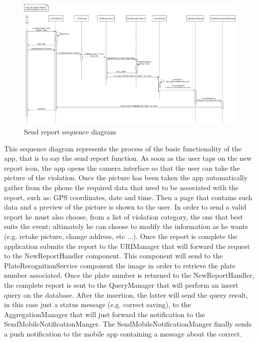 \begin{figure}[H]
  \centering
  \includegraphics[width=1\textwidth]{Images/UML_diagrams/Sequence_Diagrams/Send_Report_sd.png}
  \caption{Send report sequence diagram}
  \label{fig:send_report_sd}
\end{figure}
This sequence diagram represents the process of the basic functionality of the app, that is to say the send report function. As soon as the user taps on the new report icon, the app opens the camera interface so that the user can take the picture of the violation. Once the picture has been taken the app automatically gather from the phone the required data that need to be associated with the report, such as: GPS coordinates, date and time. Then a page that contains such data and a preview of the picture is shown to the user. In order to send a valid report he must also choose, from a list of violation category, the one that best suits the event; ultimately he can choose to modify the information as he wants (e.g. retake picture, change address, etc ...). Once the report is complete the application submits the report to the URIManager that will forward the request to the NewReportHandler component. This component will send to the PlateRecognitionService component the image in order to retrieve the plate number associated. Once the plate number is returned to the NewReportHandler, the complete report is sent to the QueryManager that will perform an insert query on the database. After the insertion, the latter will send the query result, in this case just a status message (e.g. correct saving), to the AggregationManager that will just forward the notification to the SendMobileNotificationManger. The SendMobileNotificationManger finally sends a push notification to the mobile app containing a message about the correct.
 